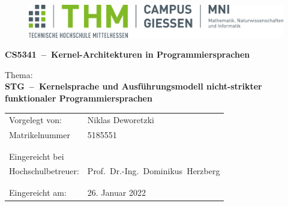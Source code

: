 \documentclass[12pt]{report}
\newcommand{\MyName}{Niklas Deworetzki}
\newcommand{\MyTitle}{CS5341~--~Kernel-Architekturen in Programmiersprachen}
\newcommand{\MyTopic}{STG~--~Kernelsprache und Ausführungsmodell nicht-strikter funktionaler Programmiersprachen}        %
\renewcommand\_{\textunderscore\allowbreak}
\begin{document}
\pagestyle{empty}


\begin{titlepage}
  \begin{center}
    \begin{figure}
      \includegraphics[width=.9\textwidth]{LOGO_THM_CG_FB06}
    \end{figure}
  \end{center}
  \Large
  \begin{center}
    \vspace{1cm}
    \textbf{\MyTitle{}}\linebreak
    \vspace{1cm}
  \end{center}
  \large
  Thema:\\
  \textbf{\MyTopic{}}

  \normalsize
  \vfill
  \begin{center}
    \begin{tabular*}{0.75\textwidth}%
      {@{\extracolsep{\fill}}ll}

      {Vorgelegt von:} & {\MyName{}}\\
      {Matrikelnummer} & {5185551}\\
      {} & {}\\
      {} & {}\\
      {Eingereicht bei} & {}\\
      {Hochschulbetreuer:} & {Prof.\ Dr.-Ing.\ Dominikus\ Herzberg}\\
      {} & {}\\
      {} & {}\\
      {Eingereicht am:} & {26. Januar 2022}

    \end{tabular*}
  \end{center}

  \vfill
\end{titlepage}



\addtocounter{page}{1}
\pagestyle{fancy}
\end{document}
